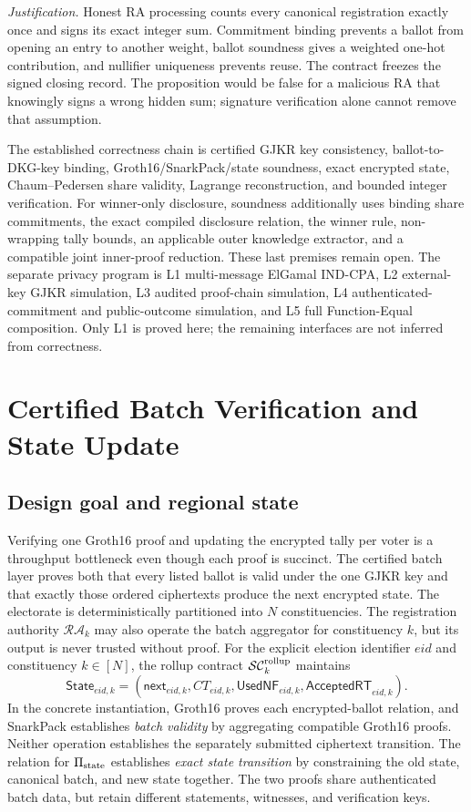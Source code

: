 \documentclass[pdflatex,sn-mathphys-num]{sn-jnl}%
\theoremstyle{thmstyleone}%
\theoremstyle{thmstyletwo}%
\theoremstyle{thmstylethree}%
\begin{document}
\textit{Justification.}  Honest RA processing counts every canonical
registration exactly once and signs its exact integer sum.  Commitment binding
prevents a ballot from opening an entry to another weight, ballot soundness
gives a weighted one-hot contribution, and nullifier uniqueness prevents
reuse.  The contract freezes the signed closing record.  The proposition
would be false for a malicious RA that knowingly signs a wrong hidden sum;
signature verification alone cannot remove that assumption.

The established correctness chain is certified GJKR key consistency,
ballot-to-DKG-key binding, Groth16/SnarkPack/state soundness, exact encrypted
state, Chaum--Pedersen share validity, Lagrange reconstruction, and bounded
integer verification.  For winner-only disclosure, soundness additionally
uses binding share commitments, the exact compiled disclosure relation, the
winner rule, non-wrapping tally bounds, an applicable outer knowledge
extractor, and a compatible joint inner-proof reduction.  These last premises
remain open.  The separate privacy program is
L1 multi-message ElGamal IND-CPA, L2 external-key GJKR simulation, L3 audited
proof-chain simulation, L4 authenticated-commitment and public-outcome
simulation, and L5 full Function-Equal composition.  Only L1 is proved here;
the remaining interfaces are not inferred from correctness.

\section{Certified Batch Verification and State Update}\label{sec5}

\subsection{Design goal and regional state}\label{subsec:batch-goal}

Verifying one Groth16 proof and updating the encrypted tally per voter is a
throughput bottleneck even though each proof is succinct.  The certified batch
layer proves both that every listed ballot is valid under the one GJKR key and
that exactly those ordered ciphertexts produce the next encrypted state.  The
electorate is deterministically partitioned into $N$ constituencies. The
registration authority $\mathcal{RA}_k$ may also operate the batch aggregator
for constituency $k$, but its output is never trusted without proof. For the
explicit election identifier $eid$ and constituency $k\in[N]$, the rollup
contract $\mathcal{SC}^{\rm rollup}_k$ maintains
\[
 \mathsf{State}_{eid,k}=
 (\mathsf{next}_{eid,k},CT_{eid,k},\mathsf{UsedNF}_{eid,k},
  \mathsf{AcceptedRT}_{eid,k}).
\]
In the concrete instantiation, Groth16 proves each encrypted-ballot relation,
and SnarkPack establishes \emph{batch validity} by aggregating compatible
Groth16 proofs.  Neither operation establishes the separately submitted
ciphertext transition.  The relation for $\Pi_{\rm state}$ establishes
\emph{exact state transition} by constraining the old state, canonical batch,
and new state together.  The two proofs share authenticated batch data, but
retain different statements, witnesses, and verification keys.
\end{document}
